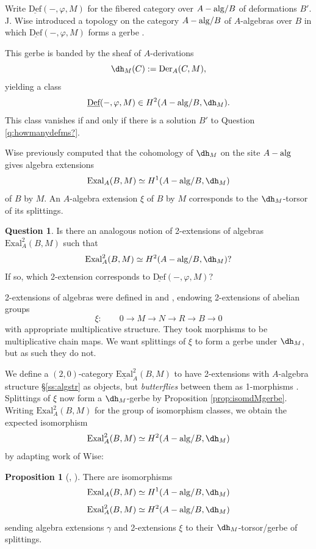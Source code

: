 \documentclass[11pt,reqno]{amsart}
\theoremstyle{definition}
\newtheorem{proposition}[theorem]{Proposition}
\newtheorem{question}[theorem]{Question}
\newcommand{\Der}{\textrm{Der}}
\newcommand{\dd}[1]{\dh_{#1}}
\newcommand{\EExal}{\underline{\textrm{Exal}}}
\newcommand{\DDef}{\underline{\textrm{Def}}}
\newcommand{\Exal}{\textrm{Exal}}
\newcommand{\Aalg}{A-{\rm alg}}
\begin{document}
Write $\DDef(-, \varphi, M)$ for the fibered category over $\Aalg/B$ of deformations $B'$. J. Wise introduced a topology on the category $\Aalg/B$ of $A$-algebras over $B$ in which $\DDef(-, \varphi, M)$ forms a gerbe \cite[\S 4.1]{wisealgs2}. 

This gerbe is banded by the sheaf of $A$-derivations
\[\dd{M}(C) := \Der_A(C, M),\]
yielding a class
\[\DDef(-, \varphi, M) \in H^2(\Aalg/B, \dd{M}).\]
This class vanishes if and only if there is a solution $B'$ to Question \ref{q:howmanydefms?}. 

Wise previously computed that the cohomology of $\dd{M}$ on the site $\Aalg$ gives algebra extensions
\[\Exal_A(B, M) \simeq H^1(\Aalg/B, \dd{M})\]
of $B$ by $M$. An $A$-algebra extension $\xi$ of $B$ by $M$ corresponds to the $\dd{M}$-torsor of its splittings. 

\begin{question}
Is there an analogous notion of 2-extensions of algebras $\Exal^2_A(B, M)$ such that
\[\Exal^2_A(B, M) \simeq H^2(\Aalg/B, \dd{M})?\]
If so, which 2-extension corresponds to $\DDef(-, \varphi, M)$?
\end{question}

2-extensions of algebras were defined in \cite{gerstenhaber2} and \cite{lichtenbaumschlessinger}, endowing 2-extensions of abelian groups
\[\xi : \qquad 0 \to M \to N \to R \to B \to 0\]
with appropriate multiplicative structure. They took morphisms to be multiplicative chain maps. We want splittings of $\xi$ to form a gerbe under $\dd{M}$, but as such they do not. 

We define a $(2, 0)$-category $\EExal_A^2(B, M)$ to have 2-extensions with $A$-algebra structure \S \ref{ss:algstr} as objects, but \emph{butterflies} between them as 1-morphisms \cite{butterfliesoriginalnoohialdrovandi}. Splittings of $\xi$ now form a $\dd{M}$-gerbe by Proposition \ref{prop:isomdMgerbe}. Writing $\Exal^2_A(B, M)$ for the group of isomorphism classes, we obtain the expected isomorphism
\[\Exal_A^2(B, M) \simeq H^2(\Aalg/B, \dd{M})\]
by adapting work of Wise:

\begin{proposition}[{\cite[Theorem 2]{wisealgs1}}, {\cite[Lemma 4.2]{wisealgs2}}]\label{prop:explicitcohomisexal}
There are isomorphisms 
\[\Exal_A(B, M) \simeq H^1(\Aalg/B, \dd{M})\]
\[\Exal_A^2(B, M) \simeq H^2(\Aalg/B, \dd{M})\]
sending algebra extensions $\gamma$ and 2-extensions $\xi$ to their $\dd{M}$-torsor/gerbe of splittings. 
\end{proposition}
\end{document}
